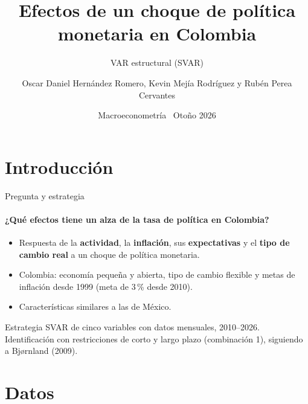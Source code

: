\documentclass{beamer}
\title{Efectos de un choque de política monetaria en Colombia}
\subtitle{VAR estructural (SVAR)}
\author[Equipo 1]{Oscar Daniel Hernández Romero, Kevin Mejía Rodríguez y Rubén Perea Cervantes}
\date{Macroeconometría \textperiodcentered\ Otoño 2026}
\begin{document}
\portada

\section{Introducción}

\begin{frame}{Pregunta y estrategia}
  \framesubtitle{¿Qué efectos tiene un alza de la tasa de política en Colombia?}
  \begin{itemize}
    \item Respuesta de la \textbf{actividad}, la \textbf{inflación}, sus
    \textbf{expectativas} y el \textbf{tipo de cambio real} a un choque de política monetaria.
    \item Colombia: economía pequeña y abierta, tipo de cambio flexible y metas de
    inflación desde 1999 (meta de 3\,\% desde 2010).
    \item Características similares a las de México.
  \end{itemize}
  \vfill
  \begin{block}{Estrategia}
    SVAR de cinco variables con datos mensuales, 2010--2026.\\
    Identificación con restricciones de \alert{corto y largo plazo}
    (combinación 1), siguiendo a Bj{\o}rnland (2009).
  \end{block}
\end{frame}

\section{Datos}
\end{document}

